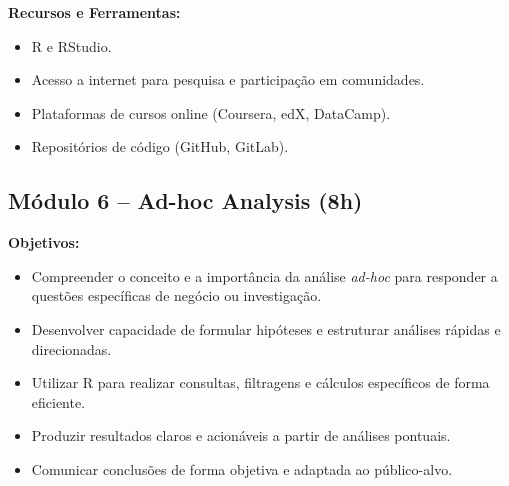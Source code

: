 \documentclass[12pt]{article}
\begin{document}
\textbf{Recursos e Ferramentas:}
\begin{itemize}
  \item R e RStudio.
  \item Acesso a internet para pesquisa e participação em comunidades.
  \item Plataformas de cursos online (Coursera, edX, DataCamp).
  \item Repositórios de código (GitHub, GitLab).
\end{itemize}





\subsection*{Módulo 6 – Ad-hoc Analysis (8h)}

\textbf{Objetivos:}
\begin{itemize}
  \item Compreender o conceito e a importância da análise \textit{ad-hoc} para responder a questões específicas de negócio ou investigação.
  \item Desenvolver capacidade de formular hipóteses e estruturar análises rápidas e direcionadas.
  \item Utilizar R para realizar consultas, filtragens e cálculos específicos de forma eficiente.
  \item Produzir resultados claros e acionáveis a partir de análises pontuais.
  \item Comunicar conclusões de forma objetiva e adaptada ao público-alvo.
\end{itemize}
\end{document}
